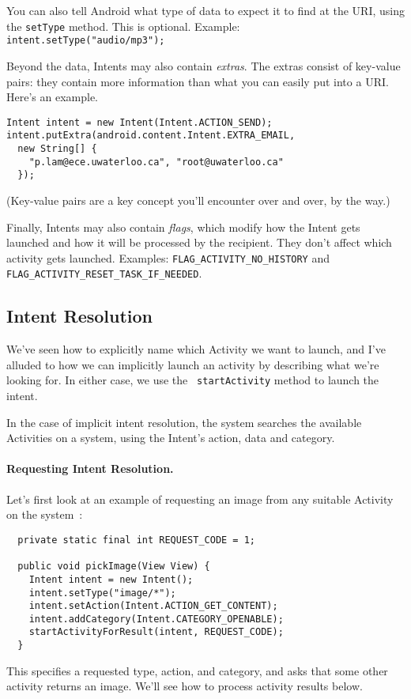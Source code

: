 You can also tell Android what type of data to expect it to find at
the URI, using the {\tt setType} method. This is optional. Example: {\tt
  intent.setType("audio/mp3");}


Beyond the data, Intents may also contain \emph{extras}. The extras
consist of key-value pairs: they contain more information than what you
can easily put into a URI. Here's an example.

{ 
\begin{verbatim}
Intent intent = new Intent(Intent.ACTION_SEND);
intent.putExtra(android.content.Intent.EXTRA_EMAIL,
  new String[] {
    "p.lam@ece.uwaterloo.ca", "root@uwaterloo.ca"
  });
\end{verbatim}
}

(Key-value pairs are a key concept you'll encounter over and over, by
  the way.)

Finally, Intents may also contain \emph{flags}, which modify how the
Intent gets launched and how it will be processed by the recipient. 
They don't affect which activity gets launched. Examples: {\tt FLAG\_ACTIVITY\_NO\_HISTORY} and 
{\tt FLAG\_ACTIVITY\_RESET\_TASK\_IF\_NEEDED}.

\subsection*{Intent Resolution}
We've seen how to explicitly name which Activity we want to launch,
and I've alluded to how we can implicitly launch an activity by
describing what we're looking for. In either case, we use the {\tt
  startActivity} method to launch the intent.

In the case of implicit intent resolution, the system searches the
available Activities on a system, using the Intent's action, data
and category.

\paragraph{Requesting Intent Resolution.} Let's first look at an example of requesting an image from any 
suitable Activity on the
system~\cite{vogella}:
{ 
\begin{verbatim}
  private static final int REQUEST_CODE = 1;

  public void pickImage(View View) {
    Intent intent = new Intent();
    intent.setType("image/*");
    intent.setAction(Intent.ACTION_GET_CONTENT);
    intent.addCategory(Intent.CATEGORY_OPENABLE);
    startActivityForResult(intent, REQUEST_CODE);
  }
\end{verbatim}
}
This specifies a requested type, action, and category, and asks that
some other activity returns an image. We'll see how to process
activity results below.


